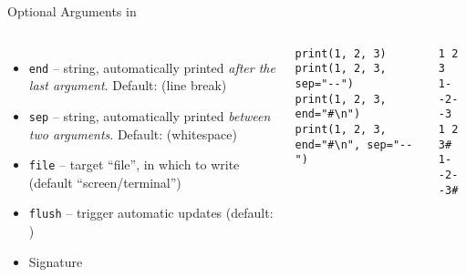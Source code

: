 \begin{frame}[fragile]{Optional Arguments in }
%
\begin{columns}[T]
\begin{itemize}
\item \texttt{end} -- string, automatically printed \emph{after the last argument}. Default:  (line break)
\item \texttt{sep} -- string, automatically printed \emph{between two arguments}. Default:  (whitespace)
\item \texttt{file} -- target \enquote{file}, in which to write (default \enquote{screen/terminal})
\item \texttt{flush} -- trigger automatic updates (default: )
\item Signature 
\end{itemize}
%
\begin{codebox}
\begin{verbatim}
print(1, 2, 3)
print(1, 2, 3, sep="--")
print(1, 2, 3, end="#\n")
print(1, 2, 3, end="#\n", sep="--")
\end{verbatim}
\end{codebox}
%
\begin{cmdbox}
\begin{verbatim}
1 2 3
1--2--3
1 2 3#
1--2--3#
\end{verbatim}
\end{cmdbox}
\end{columns}
%
\end{frame}


